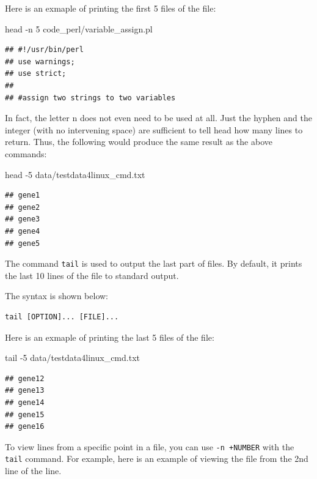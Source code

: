 \documentclass[]{book}
\makeatletter
\newenvironment{Shaded}{\begin{snugshade}}{\end{snugshade}}
\newcommand{\FunctionTok}[1]{\textcolor[rgb]{0.00,0.00,0.00}{#1}}
\newcommand{\NormalTok}[1]{#1}
\newenvironment{kframe}{%
\medskip{}
\setlength{\fboxsep}{.8em}
 \def\at@end@of@kframe{}%
 \ifinner\ifhmode%
  \def\at@end@of@kframe{\end{minipage}}%
  \begin{minipage}{\columnwidth}%
 \fi\fi%
 \def\FrameCommand##1{\hskip\@totalleftmargin \hskip-\fboxsep
 \colorbox{shadecolor}{##1}\hskip-\fboxsep
     \hskip-\linewidth \hskip-\@totalleftmargin \hskip\columnwidth}%
 \MakeFramed {\advance\hsize-\width
   \@totalleftmargin\z@ \linewidth\hsize
   \@setminipage}}%
 {\par\unskip\endMakeFramed%
 \at@end@of@kframe}
\renewenvironment{Shaded}{\begin{kframe}}{\end{kframe}}
\theoremstyle{definition}
\theoremstyle{definition}
\theoremstyle{definition}
\theoremstyle{remark}
\makeatother
\begin{document}
Here is an exmaple of printing the first 5 files of the file:

\begin{Shaded}
\begin{Highlighting}[]
\FunctionTok{head}\NormalTok{ -n 5 code_perl/variable_assign.pl}
\end{Highlighting}
\end{Shaded}

\begin{verbatim}
## #!/usr/bin/perl
## use warnings;
## use strict;
## 
## #assign two strings to two variables
\end{verbatim}

In fact, the letter n does not even need to be used at all. Just the
hyphen and the integer (with no intervening space) are sufficient to
tell head how many lines to return. Thus, the following would produce
the same result as the above commands:

\begin{Shaded}
\begin{Highlighting}[]
\FunctionTok{head}\NormalTok{ -5 data/testdata4linux_cmd.txt}
\end{Highlighting}
\end{Shaded}

\begin{verbatim}
## gene1
## gene2
## gene3
## gene4
## gene5
\end{verbatim}

The command \texttt{tail} is used to output the last part of files. By
default, it prints the last 10 lines of the file to standard output.

The syntax is shown below:

\begin{verbatim}
tail [OPTION]... [FILE]...
\end{verbatim}

Here is an exmaple of printing the last 5 files of the file:

\begin{Shaded}
\begin{Highlighting}[]
\FunctionTok{tail}\NormalTok{ -5 data/testdata4linux_cmd.txt}
\end{Highlighting}
\end{Shaded}

\begin{verbatim}
## gene12
## gene13
## gene14
## gene15
## gene16
\end{verbatim}

To view lines from a specific point in a file, you can use
\texttt{-n\ +NUMBER} with the \texttt{tail} command. For example, here
is an example of viewing the file from the 2nd line of the line.
\end{document}
